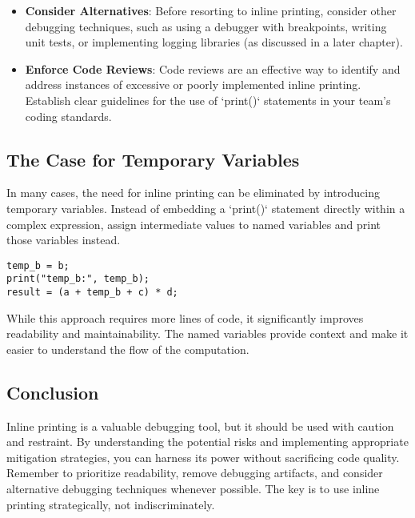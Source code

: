 \documentclass{article}
\begin{document}
{{{{\begin{itemize}
        \begin{verbatim}
        print("Value of count in loop:", count);
        \end{verbatim}

    \item \textbf{Consider Alternatives}: Before resorting to inline printing, consider other debugging techniques, such as using a debugger with breakpoints, writing unit tests, or implementing logging libraries (as discussed in a later chapter).
    \item \textbf{Enforce Code Reviews}: Code reviews are an effective way to identify and address instances of excessive or poorly implemented inline printing.  Establish clear guidelines for the use of `print()` statements in your team's coding standards.
\end{itemize}

\subsection*{The Case for Temporary Variables}

In many cases, the need for inline printing can be eliminated by introducing temporary variables.  Instead of embedding a `print()` statement directly within a complex expression, assign intermediate values to named variables and print those variables instead.

\begin{verbatim}
temp_b = b;
print("temp_b:", temp_b);
result = (a + temp_b + c) * d;
\end{verbatim}

While this approach requires more lines of code, it significantly improves readability and maintainability.  The named variables provide context and make it easier to understand the flow of the computation.

\subsection*{Conclusion}

Inline printing is a valuable debugging tool, but it should be used with caution and restraint.  By understanding the potential risks and implementing appropriate mitigation strategies, you can harness its power without sacrificing code quality. Remember to prioritize readability, remove debugging artifacts, and consider alternative debugging techniques whenever possible. The key is to use inline printing strategically, not indiscriminately.

}}}}
\end{document}
